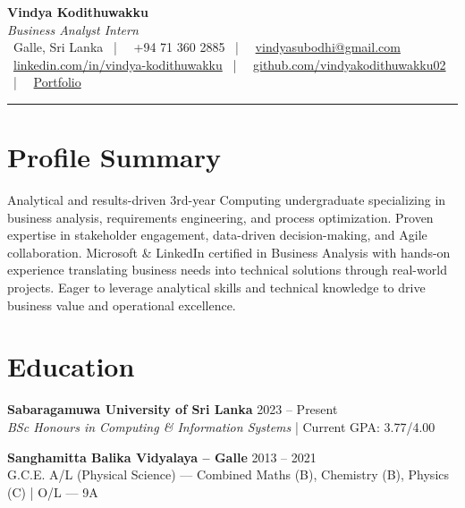 \documentclass[letterpaper,10pt]{article}
\begin{document}
\begin{center}
{\Huge\color{accentTitle}\textbf{Vindya Kodithuwakku}}\\[3pt]
{\large\textit{Business Analyst Intern }}\\[4pt]
\faMapMarker*~Galle, Sri Lanka ~|~
\faPhone~+94 71 360 2885 ~|~
\faEnvelope~\href{mailto:vindyasubodhi@gmail.com}{vindyasubodhi@gmail.com}\\[1pt]
\faLinkedin~\href{https://www.linkedin.com/in/vindya-kodithuwakku-bb6187202}{linkedin.com/in/vindya-kodithuwakku} ~|~
\faGithub~\href{https://github.com/vindyakodithuwakku02}{github.com/vindyakodithuwakku02} ~|~
\faGlobe~\href{https://vindyakodithuwakku02.github.io/my_portfolio/}{Portfolio}\\[4pt]
{\color{accentLine}\hrule}
\end{center}

\section{Profile Summary}
\vspace{-1pt}
Analytical and results-driven 3rd-year Computing undergraduate specializing in business analysis, requirements engineering, and process optimization. Proven expertise in stakeholder engagement, data-driven decision-making, and Agile collaboration. Microsoft \& LinkedIn certified in Business Analysis with hands-on experience translating business needs into technical solutions through real-world projects. Eager to leverage analytical skills and technical knowledge to drive business value and operational excellence.

\section{Education}
\vspace{-1pt}

\textbf{Sabaragamuwa University of Sri Lanka} \hfill 2023 – Present\\
\textit{BSc Honours in Computing \& Information Systems} | Current GPA: 3.77/4.00

\vspace{2pt}
\textbf{Sanghamitta Balika Vidyalaya – Galle} \hfill 2013 – 2021\\
G.C.E. A/L (Physical Science) — Combined Maths (B), Chemistry (B), Physics (C) | O/L — 9A
\end{document}
